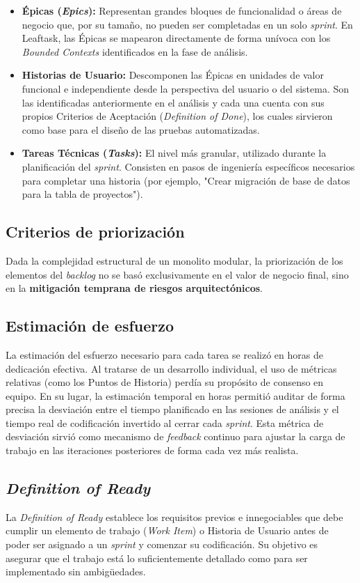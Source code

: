 \begin{itemize}
    \item \textbf{Épicas (\emph{Epics}):} Representan grandes bloques de funcionalidad o áreas de negocio que, por su tamaño, no pueden ser completadas en un solo \emph{sprint}. En Leaftask, las Épicas se mapearon directamente de forma unívoca con los \emph{Bounded Contexts} identificados en la fase de análisis.
    \item \textbf{Historias de Usuario:} Descomponen las Épicas en unidades de valor funcional e independiente desde la perspectiva del usuario o del sistema. Son las identificadas anteriormente en el análisis y cada una cuenta con sus propios Criterios de Aceptación (\emph{Definition of Done}), los cuales sirvieron como base para el diseño de las pruebas automatizadas.
    \item \textbf{Tareas Técnicas (\emph{Tasks}):} El nivel más granular, utilizado durante la planificación del \emph{sprint}. Consisten en pasos de ingeniería específicos necesarios para completar una historia (por ejemplo, "Crear migración de base de datos para la tabla de proyectos").
\end{itemize}

\subsection{Criterios de priorización}
Dada la complejidad estructural de un monolito modular, la priorización de los elementos del \emph{backlog} no se basó exclusivamente en el valor de negocio final, sino en la \textbf{mitigación temprana de riesgos arquitectónicos}. 

\subsection{Estimación de esfuerzo}
La estimación del esfuerzo necesario para cada tarea se realizó en horas de dedicación efectiva. Al tratarse de un desarrollo individual, el uso de métricas relativas (como los Puntos de Historia) perdía su propósito de consenso en equipo. En su lugar, la estimación temporal en horas permitió auditar de forma precisa la desviación entre el tiempo planificado en las sesiones de análisis y el tiempo real de codificación invertido al cerrar cada \emph{sprint}. Esta métrica de desviación sirvió como mecanismo de \emph{feedback} continuo para ajustar la carga de trabajo en las iteraciones posteriores de forma cada vez más realista.

\subsection{\emph{Definition of Ready}}
La \emph{Definition of Ready} establece los requisitos previos e innegociables que debe cumplir un elemento de trabajo (\emph{Work Item}) o Historia de Usuario antes de poder ser asignado a un \emph{sprint} y comenzar su codificación. Su objetivo es asegurar que el trabajo está lo suficientemente detallado como para ser implementado sin ambigüedades.

